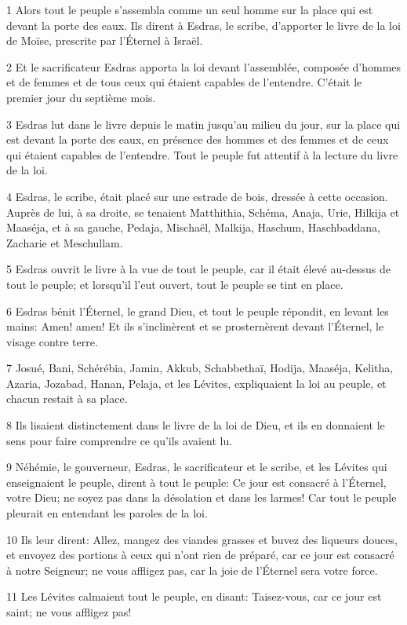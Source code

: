 \par 1 Alors tout le peuple s'assembla comme un seul homme sur la place qui est devant la porte des eaux. Ils dirent à Esdras, le scribe, d'apporter le livre de la loi de Moïse, prescrite par l'Éternel à Israël.
\par 2 Et le sacrificateur Esdras apporta la loi devant l'assemblée, composée d'hommes et de femmes et de tous ceux qui étaient capables de l'entendre. C'était le premier jour du septième mois.
\par 3 Esdras lut dans le livre depuis le matin jusqu'au milieu du jour, sur la place qui est devant la porte des eaux, en présence des hommes et des femmes et de ceux qui étaient capables de l'entendre. Tout le peuple fut attentif à la lecture du livre de la loi.
\par 4 Esdras, le scribe, était placé sur une estrade de bois, dressée à cette occasion. Auprès de lui, à sa droite, se tenaient Matthithia, Schéma, Anaja, Urie, Hilkija et Maaséja, et à sa gauche, Pedaja, Mischaël, Malkija, Haschum, Haschbaddana, Zacharie et Meschullam.
\par 5 Esdras ouvrit le livre à la vue de tout le peuple, car il était élevé au-dessus de tout le peuple; et lorsqu'il l'eut ouvert, tout le peuple se tint en place.
\par 6 Esdras bénit l'Éternel, le grand Dieu, et tout le peuple répondit, en levant les mains: Amen! amen! Et ils s'inclinèrent et se prosternèrent devant l'Éternel, le visage contre terre.
\par 7 Josué, Bani, Schérébia, Jamin, Akkub, Schabbethaï, Hodija, Maaséja, Kelitha, Azaria, Jozabad, Hanan, Pelaja, et les Lévites, expliquaient la loi au peuple, et chacun restait à sa place.
\par 8 Ils lisaient distinctement dans le livre de la loi de Dieu, et ils en donnaient le sens pour faire comprendre ce qu'ils avaient lu.
\par 9 Néhémie, le gouverneur, Esdras, le sacrificateur et le scribe, et les Lévites qui enseignaient le peuple, dirent à tout le peuple: Ce jour est consacré à l'Éternel, votre Dieu; ne soyez pas dans la désolation et dans les larmes! Car tout le peuple pleurait en entendant les paroles de la loi.
\par 10 Ils leur dirent: Allez, mangez des viandes grasses et buvez des liqueurs douces, et envoyez des portions à ceux qui n'ont rien de préparé, car ce jour est consacré à notre Seigneur; ne vous affligez pas, car la joie de l'Éternel sera votre force.
\par 11 Les Lévites calmaient tout le peuple, en disant: Taisez-vous, car ce jour est saint; ne vous affligez pas!
